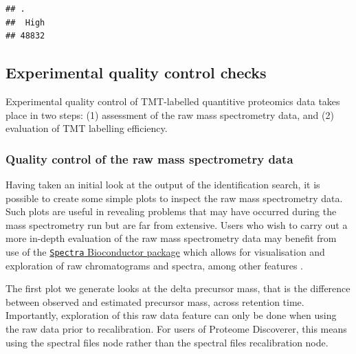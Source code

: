 \documentclass[9pt,a4paper,]{extarticle}
\begin{document}
\begin{verbatim}
## .
##  High 
## 48832
\end{verbatim}

\subsection{Experimental quality control checks}\label{experimental-quality-control-checks}

Experimental quality control of TMT-labelled quantitive proteomics data takes
place in two steps: (1) assessment of the raw mass spectrometry data, and (2)
evaluation of TMT labelling efficiency.

\subsubsection{Quality control of the raw mass spectrometry data}\label{quality-control-of-the-raw-mass-spectrometry-data}

Having taken an initial look at the output of the identification search, it is
possible to create some simple plots to inspect the raw mass spectrometry data.
Such plots are useful in revealing problems that may have occurred during
the mass spectrometry run but are far from extensive. Users who wish to carry
out a more in-depth evaluation of the raw mass spectrometry data may benefit
from use of the
\href{https://bioconductor.org/packages/release/bioc/html/Spectra.html}{\texttt{Spectra} Bioconductor package}
which allows for visualisation and exploration of raw chromatograms and spectra,
among other features \citep{Rainer2022}.

The first plot we generate looks at the delta precursor mass, that is the
difference between observed and estimated precursor mass, across retention time.
Importantly, exploration of this raw data feature can only be done when using
the raw data prior to recalibration. For users of Proteome Discoverer, this
means using the spectral files node rather than the spectral files recalibration
node.
\end{document}
